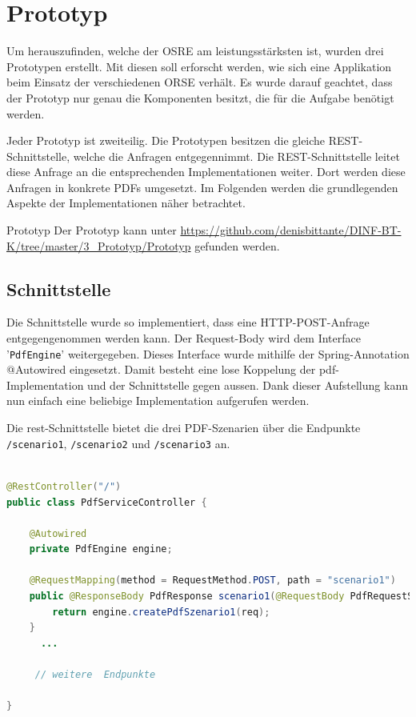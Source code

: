 \documentclass[main.tex]{subfiles}
\begin{document}
\chapter{Prototyp}
Um herauszufinden, welche der OSRE am leistungsstärksten ist, wurden drei Prototypen erstellt. Mit diesen soll erforscht werden, wie sich eine Applikation beim Einsatz der verschiedenen ORSE verhält. Es wurde darauf geachtet, dass der Prototyp nur genau die Komponenten besitzt, die für die Aufgabe benötigt werden.  

Jeder Prototyp ist zweiteilig. Die Prototypen besitzen die gleiche REST-Schnittstelle, welche die Anfragen entgegennimmt. Die REST-Schnittstelle leitet diese Anfrage an die entsprechenden Implementationen weiter. Dort werden diese Anfragen in konkrete PDFs umgesetzt. Im Folgenden werden die grundlegenden Aspekte der Implementationen näher betrachtet. 

\begin{reference}{Prototyp}
 Der Prototyp kann unter \url{https://github.com/denisbittante/DINF-BT-K/tree/master/3_Prototyp/Prototyp} gefunden werden.
\end{reference}

\section{Schnittstelle}


Die Schnittstelle wurde so implementiert, dass eine HTTP-POST-Anfrage entgegengenommen werden kann. Der Request-Body wird dem Interface '\texttt{PdfEngine}' weitergegeben. Dieses Interface wurde mithilfe der Spring-Annotation @Autowired eingesetzt. Damit besteht eine lose Koppelung der \acrshort{pdf}-Implementation und der Schnittstelle gegen aussen. Dank dieser Aufstellung kann nun einfach eine beliebige Implementation aufgerufen werden.

Die \acrshort{rest}-Schnittstelle bietet die drei PDF-Szenarien über die Endpunkte \texttt{/scenario1}, \texttt{/scenario2} und \texttt{/scenario3} an.   

\begin{lstlisting}[language=Java,caption={Auszug REST-Implementation },captionpos=b]

@RestController("/")
public class PdfServiceController {

	@Autowired
	private PdfEngine engine;

	@RequestMapping(method = RequestMethod.POST, path = "scenario1")
	public @ResponseBody PdfResponse scenario1(@RequestBody PdfRequestScenario1 req) {
		return engine.createPdfSzenario1(req);
	}
      ...
      
     // weitere  Endpunkte 
    
}
\end{lstlisting}
\end{document}
